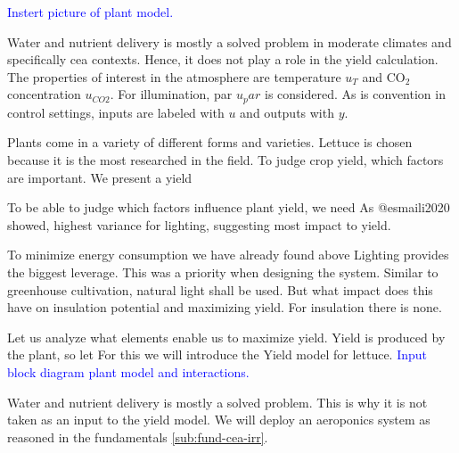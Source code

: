 


\textcolor{Blue}{Instert picture of plant model.}

Water and nutrient delivery is mostly a solved problem in moderate climates and specifically \ac{cea} contexts.
Hence, it does not play a role in the yield calculation.
The properties of interest in the atmosphere are temperature $u_T$ and CO$_2$ concentration $u_{CO2}$.
For illumination, \ac{par} $u_par$ is considered.
As is convention in control settings, inputs are labeled with $u$ and outputs with $y$.



Plants come in a variety of different forms and varieties.
Lettuce is chosen because it is the most researched in the field.
To judge crop yield, which factors are important.
We present a yield 

To be able to judge which factors influence plant yield, we need
As @esmaili2020 showed, highest variance for lighting, suggesting most impact to yield.

To minimize energy consumption we have already found above 
Lighting provides the biggest leverage.
This was a priority when designing the system.
Similar to greenhouse cultivation, natural light shall be used.
But what impact does this have on insulation potential and maximizing yield.
For insulation there is none.

Let us analyze what elements enable us to maximize yield.
Yield is produced by the plant, so let 
For this we will introduce the Yield model for lettuce.
\textcolor{Blue}{Input block diagram plant model and interactions.}

Water and nutrient delivery is mostly a solved problem.
This is why it is not taken as an input to the yield model.
We will deploy an aeroponics system as reasoned in the fundamentals \ref{sub:fund-cea-irr}.

